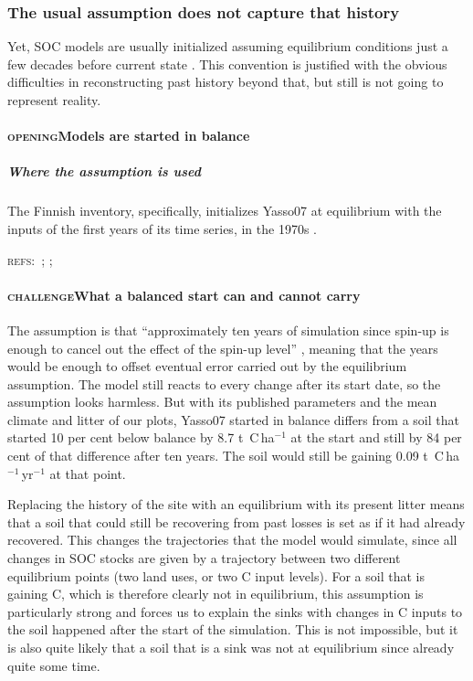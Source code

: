 \documentclass[11pt]{article}
\newcounter{subsubparagraph}[subparagraph]
\newcommand{\beat}[1]{\textcolor{black!45}{\textsc{\small #1}}\enspace}
\newcommand{\refs}[1]{\par\textcolor{red!70!black}{\footnotesize\textsc{refs:}\ #1}\par}
\begin{document}

\subsubsection{The usual assumption does not capture that history}
Yet, SOC models are usually initialized assuming equilibrium conditions just a few decades before current state \citep{Wutzler2007}. This convention is justified with the obvious difficulties in reconstructing past history beyond that, but still is not going to represent reality.
\paragraph{\beat{opening}Models are started in balance}
\subparagraph{Where the assumption is used}
The Finnish inventory, specifically, initializes Yasso07 at equilibrium with the inputs of the
first years of its time series, in the 1970s \citep{StatFin2025NID, Lehtonen2016}.
\refs{\citet{Wutzler2007}; \citet{StatFin2025NID}; \citet{Lehtonen2016}}


\paragraph{\beat{challenge}What a balanced start can and cannot carry}
The assumption is that ``approximately ten years of simulation since spin-up is enough to cancel out the effect of
the spin-up level'' \citep{StatFin2025NID}, meaning that the years would be enough to offset eventual error carried out by the equilibrium assumption. The model still reacts to every change after its start date, so the assumption looks harmless.
But with its published parameters and the mean climate and litter of our plots, Yasso07 started in balance differs from a soil that started 10 per cent below balance by 8.7 t~C\,ha$^{-1}$ at the start and still by 84 per cent of that difference after ten years. The soil would still be gaining 0.09 t~C\,ha$^{-1}$\,yr$^{-1}$ at that point.

Replacing the history of the site with an equilibrium with its present litter means that a soil that could
still be recovering from past losses is set as if it had already recovered. This changes the trajectories that the model would simulate, since all changes in SOC stocks are given by a trajectory between two different equilibrium points (two land uses, or two C input levels). For a soil that is gaining C, which is therefore clearly not in equilibrium, this assumption is particularly strong and forces us to explain the sinks with changes in C inputs to the soil happened after the start of the simulation. This is not impossible, but it is also quite likely that a soil that is a sink was not at equilibrium since already quite some time.
\end{document}
